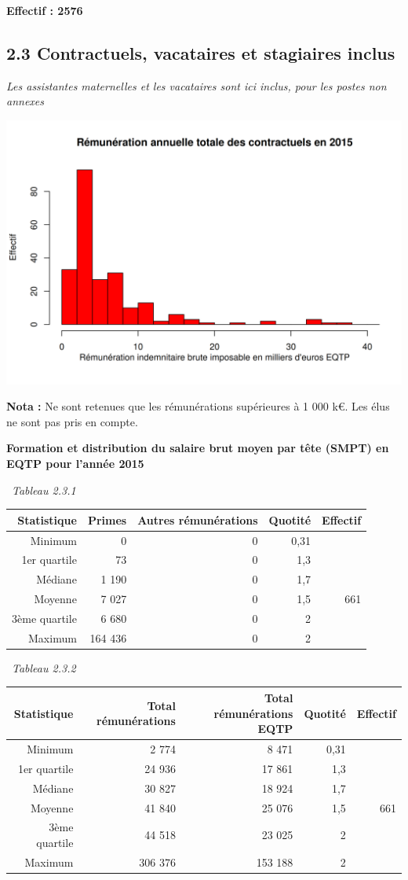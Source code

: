 \textbf{Effectif : 2576 }

\hypertarget{contractuels-vacataires-et-stagiaires-inclus}{%
\subsection{2.3 Contractuels, vacataires et stagiaires
inclus}\label{contractuels-vacataires-et-stagiaires-inclus}}

\emph{Les assistantes maternelles et les vacataires sont ici inclus,
pour les postes non annexes}

\includegraphics{altair_files/figure-latex/unnamed-chunk-61-1.png}

\textbf{Nota :} Ne sont retenues que les rémunérations supérieures à 1
000 k€. Les élus ne sont pas pris en compte.

\textbf{Formation et distribution du salaire brut moyen par tête (SMPT)
en EQTP pour l'année 2015 }

~\emph{Tableau 2.3.1}

\begin{longtable}[]{@{}rrrrr@{}}
\toprule
Statistique & Primes & Autres rémunérations & Quotité &
Effectif\tabularnewline
\midrule
\endhead
Minimum & 0 & 0 & 0,31 &\tabularnewline
1er quartile & 73 & 0 & 1,3 &\tabularnewline
Médiane & 1 190 & 0 & 1,7 &\tabularnewline
Moyenne & 7 027 & 0 & 1,5 & 661\tabularnewline
3ème quartile & 6 680 & 0 & 2 &\tabularnewline
Maximum & 164 436 & 0 & 2 &\tabularnewline
\bottomrule
\end{longtable}

~\emph{Tableau 2.3.2}

\begin{longtable}[]{@{}rrrrr@{}}
\toprule
Statistique & Total rémunérations & Total rémunérations EQTP & Quotité &
Effectif\tabularnewline
\midrule
\endhead
Minimum & 2 774 & 8 471 & 0,31 &\tabularnewline
1er quartile & 24 936 & 17 861 & 1,3 &\tabularnewline
Médiane & 30 827 & 18 924 & 1,7 &\tabularnewline
Moyenne & 41 840 & 25 076 & 1,5 & 661\tabularnewline
3ème quartile & 44 518 & 23 025 & 2 &\tabularnewline
Maximum & 306 376 & 153 188 & 2 &\tabularnewline
\bottomrule
\end{longtable}

